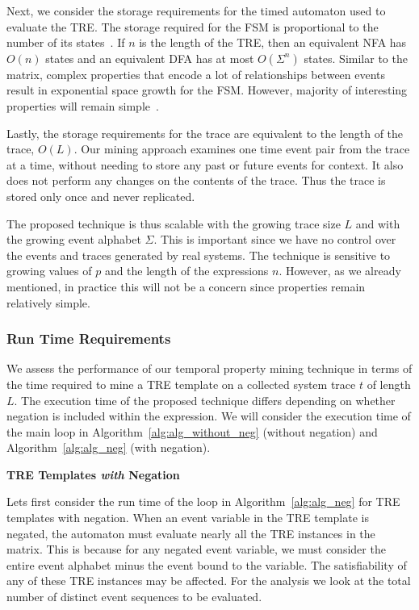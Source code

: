 \documentclass[]{sigplanconf}
\begin{document}
Next, we consider the storage requirements for the timed automaton used to evaluate the TRE.
The storage required for the FSM is proportional to the number of its states~\cite{book1}.
If $n$ is the length of the TRE, then an equivalent NFA has $O(n)$ states and an equivalent DFA has at most $O(\Sigma^n)$ states. Similar to the matrix, complex properties that encode a lot of relationships between events result in exponential space growth for the FSM. However, majority of interesting properties will remain simple~\cite{dwyer1999patterns}.

Lastly, the storage requirements for the trace are equivalent to the length of the trace, $O(L)$.
Our mining approach examines one time event pair from the trace at a time, without needing to
store any past or future events for context. It also does not perform any changes on the
contents of the trace. Thus the trace is stored only once and never replicated.


The proposed technique is thus scalable with the growing trace size $L$ and with the growing event alphabet $\Sigma$. This is important since we have no control over the events and traces generated by real systems. The technique is sensitive to growing values of $p$ and the length of the expressions $n$. However, as we already mentioned, in practice this will not be a concern since properties remain relatively simple.

\subsubsection{Run Time Requirements}

We assess the performance of our temporal property mining technique in terms of the time required to mine a TRE template on a collected system trace $t$ of length $L$. The execution time of the proposed technique differs depending on whether negation is included within the expression. We will consider the execution time of the main loop in Algorithm~\ref{alg:alg_without_neg} (without negation) and Algorithm~\ref{alg:alg_neg} (with negation).

\vspace{3mm}

\noindent \textbf{TRE Templates \emph{with} Negation}

Lets first consider the run time of the loop in Algorithm~\ref{alg:alg_neg} for TRE templates with negation.
When an event variable in the TRE template is negated, the automaton must evaluate nearly all the TRE instances in the matrix.
This is because for any negated event variable, we must consider the entire event alphabet minus the event bound to the variable. The satisfiability of any of these TRE instances may be affected.
For the analysis we look at the total number of distinct event sequences to be evaluated.
\end{document}
